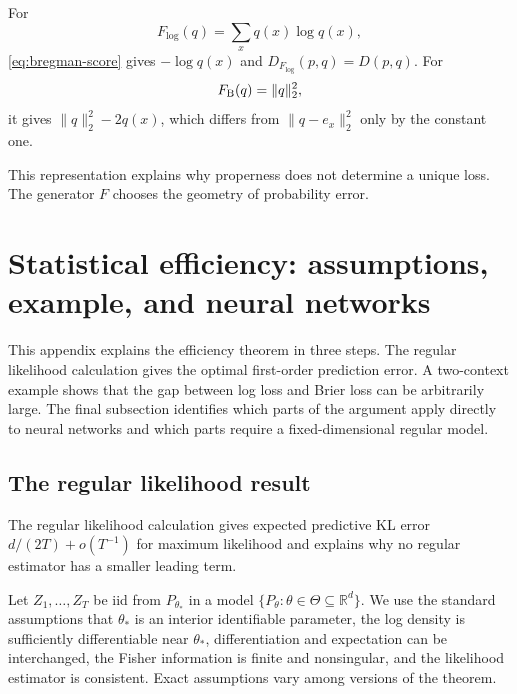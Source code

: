 \documentclass[11pt,twoside]{article}
\newcommand{\R}{\mathbb R}
\newcommand{\KL}{D}
\theoremstyle{definition}
\theoremstyle{remark}
\begin{document}
For
\[
F_{\log}(q)=\sum_xq(x)\log q(x),
\]
\cref{eq:bregman-score} gives $-\log q(x)$ and
$D_{F_{\log}}(p,q)=\KL(p, q)$. For
\[
F_{\rm B}(q)=\lVert q\rVert_2^2,
\]
it gives $\lVert q\rVert_2^2-2q(x)$, which differs from
$\lVert q-e_x\rVert_2^2$ only by the constant one.

This representation explains why properness does not determine a unique
loss. The generator $F$ chooses the geometry of probability error.

\section{Statistical efficiency: assumptions, example, and neural networks}
\label{app:efficiency}

This appendix explains the efficiency theorem in three steps. The regular
likelihood calculation gives the optimal first-order prediction error. A
two-context example shows that the gap between log loss and Brier loss can be
arbitrarily large. The final subsection identifies which parts of the argument
apply directly to neural networks and which parts require a fixed-dimensional
regular model.

\subsection{The regular likelihood result}

The regular likelihood calculation gives expected predictive KL error
$d/(2T)+o(T^{-1})$ for maximum likelihood and explains why no regular estimator
has a smaller leading term.

Let $Z_1,\ldots,Z_T$ be iid from $P_{\theta_*}$ in a model
$\{P_\theta:\theta\in\Theta\subseteq\R^d\}$. We use the standard assumptions
that $\theta_*$ is an interior identifiable parameter, the log density is
sufficiently differentiable near $\theta_*$, differentiation and expectation
can be interchanged, the Fisher information is finite and nonsingular, and the
likelihood estimator is consistent. Exact assumptions vary among versions of
the theorem.
\end{document}
